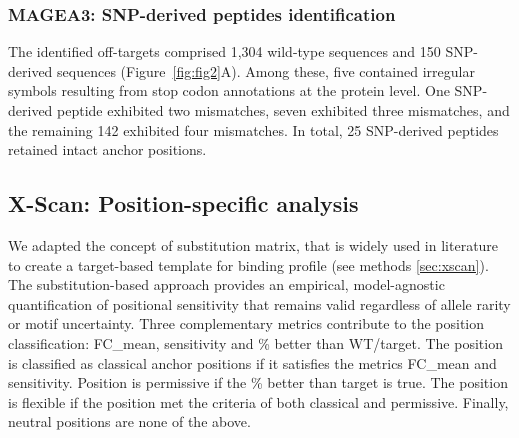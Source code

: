 \documentclass[unnumsec,webpdf,contemporary,large]{oup-authoring-template}%
\theoremstyle{thmstyleone}%
\theoremstyle{thmstyletwo}%
\theoremstyle{thmstylethree}%
\begin{document}
        \subsubsection{\textbf{MAGEA3: SNP-derived peptides identification}}
            The identified off-targets comprised 1,304 wild-type sequences and 150 SNP-derived sequences (Figure~\ref{fig:fig2}A). Among these, five contained irregular symbols resulting from stop codon annotations at the protein level. One SNP-derived peptide exhibited two mismatches, seven exhibited three mismatches, and the remaining 142 exhibited four mismatches. In total, 25 SNP-derived peptides retained intact anchor positions. 
            
    \subsection{\textbf{X-Scan: Position-specific analysis}}
        We adapted the concept of substitution matrix, that is widely used in literature \cite{reynisson2020netmhcpan, xia2023computational} to create a target-based template for binding profile (see methods \ref{sec:xscan}). 
        The substitution-based approach provides an empirical, model-agnostic quantification of positional sensitivity that remains valid regardless of allele rarity or motif uncertainty. Three complementary metrics contribute to the position classification: FC\_mean, sensitivity and \% better than WT/target. The position is classified as classical anchor positions if it satisfies the metrics FC\_mean and sensitivity. Position is permissive if the \% better than target is true. The position is flexible if the position met the criteria of both classical and permissive. Finally, neutral positions are none of the above.  
        
\end{document}
